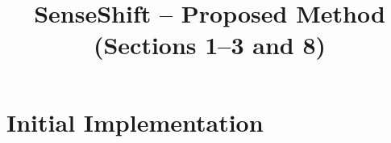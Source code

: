 \documentclass[11pt,a4paper]{article}
\title{SenseShift -- Proposed Method (Sections 1--3 and 8)}
\date{}
\begin{document}
\maketitle



\setcounter{section}{7}
\section{Initial Implementation}



\end{document}

